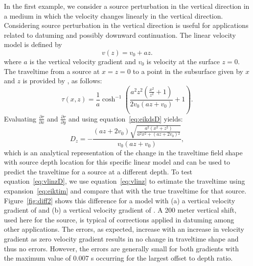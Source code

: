 In the first example, we consider a source perturbation in the
vertical direction in a medium in which the velocity changes linearly
in the vertical direction. Considering source perturbation in the
vertical direction is useful for applications related to datuming and
possibly downward continuation. The linear velocity model is defined
by
\begin{equation}
v(z) = v_0 + a z.
\label{eq:vz}
\end{equation}
where $a$ is the vertical velocity gradient and $v_0$ is velocity at
the surface $z=0$.  The traveltime from a source at $x=z=0$ to a point
in the subsurface given by $x$ and $z$ is provided by
\cite{LSC00-00-02680268}, as follows:
\begin{equation}
\tau(x,z) = \frac{1}{a} \cosh^{-1}\left(\frac{a^2 z^2 \left(\frac{x^2}{z^2}+1\right)}{2 v_0 \left(a z+v_0\right)}+1\right).
\label{eq:vlinz}
\end{equation}
Evaluating $\frac{\partial \tau}{\partial x}$ and $\frac{\partial
  \tau}{\partial y}$ and using  equation~\ref{eq:eikdsD}
yields:
\begin{equation}
D_z =- \frac{\left(a z+2 v_0\right) \sqrt{\frac{a^2 \left(x^2+z^2\right)}{a^2 x^2+\left(a z+2 v_0\right){}^2}}}{v_0 \left(a
   z+v_0\right)},
\label{eq:vlinzD}
\end{equation}
which is an analytical representation of the change in the traveltime
field shape with source depth location for this specific linear model
and can be used to predict the traveltime for a source at a different
depth.  To test equation~\ref{eq:vlinzD}, we use
equation~\ref{eq:vlinz} to estimate the traveltime using
expansion~\ref{eq:eiktim} and compare that with the true traveltime
for that source. Figure~\ref{fig:diff2} shows this difference for a
model with (a) a vertical velocity gradient of
 and (b) a vertical velocity gradient of
. A 200 meter vertical shift, used here for
the source, is typical of corrections applied in datuming among other
applications.  The errors, as expected, increase with an increase in
velocity gradient as zero velocity gradient results in no change in
traveltime shape and thus no errors. However, the errors are generally
small for both gradients with the maximum value of 0.007 s occurring
for the largest offset to depth ratio.  



